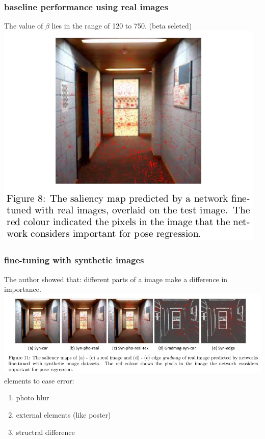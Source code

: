 \documentclass[11pt]{article}
\begin{document}
\subsubsection{baseline performance using real images}
\label{sec-5-4-2}
The value of $\beta$ lies in the range of 120 to 750. (beta seleted) \\

\includegraphics[width=.9\linewidth]{pics/saliency-map.png} \\

\subsubsection{fine-tuning with synthetic images}
\label{sec-5-4-3}
The author showed that: different parts of a image make a difference in importance. \\

\includegraphics[width=.9\linewidth]{pics/dif-importance.png} \\


elements to case error: \\
\begin{enumerate}
\item photo blur \\
\item external elements (like poster) \\
\item structral difference \\
\end{enumerate}
\end{document}
